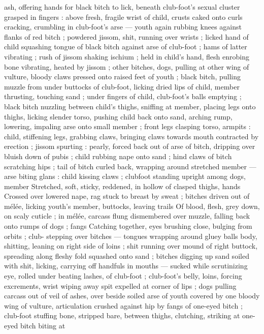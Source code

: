 ash, offering hands for black bitch to lick, beneath club-foot's sexual 
cluster grasped in fingers : above fresh, fragile wrist of child, crusts 
caked onto curls cracking, crumbling in club-foot's arse --- youth 
again rubbing knees against flanks of red bitch ; powdered jissom, 
shit, running over wrists ; licked hand of child squashing tongue of 
black bitch against arse of club-foot ; hams of latter vibrating ; rush 
of jissom shaking ischium ; held in child's hand, flesh enrobing bone 
vibrating, heated by jissom ; other bitches, dogs, pulling at other 
wing of vulture, bloody claws pressed onto raised feet of youth ; 
black bitch, pulling muzzle from under buttocks of club-foot, licking 
dried lips of child, member thrusting, touching sand ; under fingers 
of child, club-foot's balls emptying ; black bitch nuzzling between 
child's thighs, sniffing at member, placing legs onto thighs, licking 
slender torso, pushing child back onto sand, arching rump, lowering, 
impaling arse onto small member ; front legs clasping torso, armpits 
: child, stiffening legs, grabbing claws, bringing claws towards mouth 
contracted by erection ; jissom spurting : pearly, forced back out of 
arse of bitch, dripping over bluish down of pubis ; child rubbing 
nape onto sand ; hind claws of bitch scratching hips ; tail of bitch 
curled back, wrapping around stretched member --- arse biting glans 
: child kissing claws ; clubfoot standing upright among dogs, member 
Stretched, soft, sticky, reddened, in hollow of clasped thighs, hands 
Crossed over lowered nape, rag stuck to breast by sweat ; bitches 
driven out of mélée, licking youth's member, buttocks, leaving trails 
Of blood, flesh, grey down, on scaly cuticle ; in mélée, carcass flung 
dismembered over muzzle, falling back onto rumps of dogs ; fangs 
Catching together, eyes brushing close, bulging from orbits ; club- 
stepping over bitches --- tongues wrapping around gluey balls 
body, shitting, leaning on right side of loins ; shit running over 
mound of right buttock, spreading along fleshy fold squashed onto 
sand ; bitches digging up sand soiled with shit, licking, carrying off 
handfuls in mouths --- sucked while scrutinizing eye, rolled under 
beating lashes, of club-foot ; club-foot's belly, loins, forcing 
excrements, wrist wiping away spit expelled at corner of lips ; dogs 
pulling carcass out of veil of ashes, over beside soiled arse of youth 
covered by one bloody wing of vulture, articulation crushed against 
hip by fangs of one-eyed bitch ; club-foot stuffing bone, stripped 
bare, between thighs, clutching, striking at one-eyed bitch biting at 
